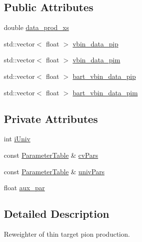 \subsection*{Public Attributes}
\begin{DoxyCompactItemize}
\item 
double \hyperlink{class_neutrino_flux_reweight_1_1_thin_targetp_c_pion_reweighter_ae2c5b20aa1823516579b0684d188d75d}{data\-\_\-prod\-\_\-xs}
\item 
std\-::vector$<$ float $>$ \hyperlink{class_neutrino_flux_reweight_1_1_thin_targetp_c_pion_reweighter_a3602ae8237c0cc7729045b13b90874b4}{vbin\-\_\-data\-\_\-pip}
\item 
std\-::vector$<$ float $>$ \hyperlink{class_neutrino_flux_reweight_1_1_thin_targetp_c_pion_reweighter_aea0dca1b93e560e26871da0bdf1ac075}{vbin\-\_\-data\-\_\-pim}
\item 
std\-::vector$<$ float $>$ \hyperlink{class_neutrino_flux_reweight_1_1_thin_targetp_c_pion_reweighter_a844e9c7ba521a42ce5ebe5fbb5b2d5f4}{bart\-\_\-vbin\-\_\-data\-\_\-pip}
\item 
std\-::vector$<$ float $>$ \hyperlink{class_neutrino_flux_reweight_1_1_thin_targetp_c_pion_reweighter_a9d7ffcf3ca0c5a7b0f1c37435cc86403}{bart\-\_\-vbin\-\_\-data\-\_\-pim}
\end{DoxyCompactItemize}
\subsection*{Private Attributes}
\begin{DoxyCompactItemize}
\item 
int \hyperlink{class_neutrino_flux_reweight_1_1_thin_targetp_c_pion_reweighter_a59ed15e151960ba8dc990d8c6bbd7567}{i\-Univ}
\item 
const \hyperlink{class_neutrino_flux_reweight_1_1_parameter_table}{Parameter\-Table} \& \hyperlink{class_neutrino_flux_reweight_1_1_thin_targetp_c_pion_reweighter_ad0ab176cd637c51c8ca5d4f87ed93ded}{cv\-Pars}
\item 
const \hyperlink{class_neutrino_flux_reweight_1_1_parameter_table}{Parameter\-Table} \& \hyperlink{class_neutrino_flux_reweight_1_1_thin_targetp_c_pion_reweighter_afc6d553d64c70f7b98636b2bb8a13b43}{univ\-Pars}
\item 
float \hyperlink{class_neutrino_flux_reweight_1_1_thin_targetp_c_pion_reweighter_a87d4a2cfb3ce6e4e5c7f0f3be1144915}{aux\-\_\-par}
\end{DoxyCompactItemize}


\subsection{Detailed Description}
Reweighter of thin target pion production. 

